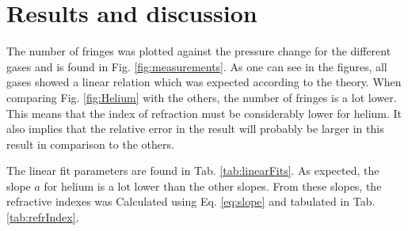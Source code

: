 \section{Results and discussion}
The number of fringes was plotted against the pressure change for the different gases and is found in Fig. \ref{fig:measurements}. As one can see in the figures, all gases showed a linear relation which was expected according to the theory. When comparing Fig. \ref{fig:Helium} with the others, the number of fringes is a lot lower. This means that the index of refraction must be considerably lower for helium. It also implies that the relative error in the result will probably be larger in this result in comparison to the others.

The linear fit parameters are found in Tab. \ref{tab:linearFits}. As expected, the slope $a$ for helium is a lot lower than the other slopes. From these slopes, the refractive indexes was Calculated using Eq. \eqref{eq:slope} and tabulated in Tab. \ref{tab:refrIndex}.

